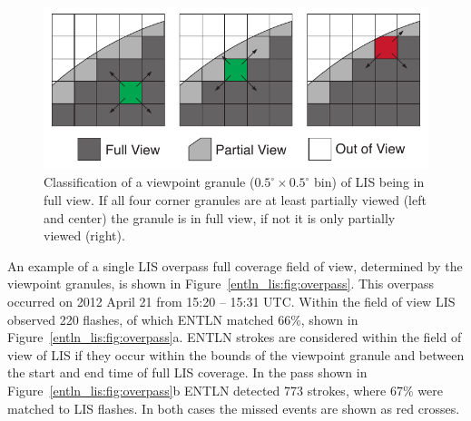 \begin{figure}[ht!]
   \begin{center}
      \includegraphics[scale=1]{entln_lis/Figures/viewpointGranule.pdf}
   \end{center}
   \caption{Classification of a viewpoint granule ($0.5^\circ \times 0.5^\circ$ bin) of LIS being in full view.
   If all four corner granules are at least partially viewed (left and center) the granule is in full view, if not it is only partially viewed (right).}
   \label{entln_lis:fig:viewpoint}
\end{figure}

An example of a single LIS overpass full coverage field of view, determined by the viewpoint granules, is shown in Figure~\ref{entln_lis:fig:overpass}.
This overpass occurred on 2012 April 21 from 15:20 -- 15:31 UTC.
Within the field of view LIS observed 220 flashes, of which ENTLN matched 66\%, shown in Figure~\ref{entln_lis:fig:overpass}a.
ENTLN strokes are considered within the field of view of LIS if they occur within the bounds of the viewpoint granule and between the start and end time of full LIS coverage.
In the pass shown in Figure~\ref{entln_lis:fig:overpass}b ENTLN detected 773 strokes, where 67\% were matched to LIS flashes.
In both cases the missed events are shown as red crosses.

